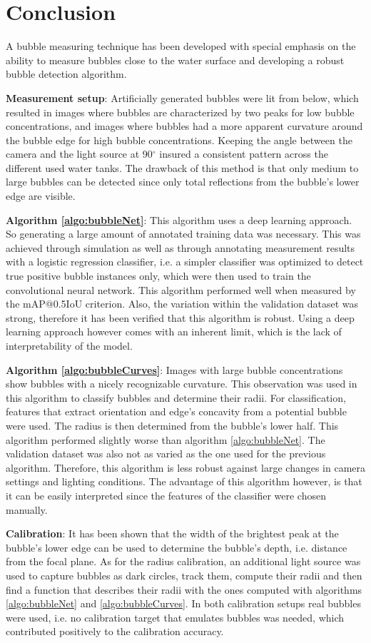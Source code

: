 \chapter{Conclusion}\label{discussion}
A bubble measuring technique has been developed with special emphasis on the ability to measure bubbles close to the water surface and developing a robust bubble detection algorithm. 

\textbf{Measurement setup}: Artificially generated bubbles were lit from below, which resulted in images where bubbles are characterized by two peaks for low bubble concentrations, and images where bubbles had a more apparent curvature around the bubble edge for high bubble concentrations. Keeping the angle between the camera and the light source at 90$^\circ$ insured a consistent pattern across the different used water tanks. The drawback of this method is that only medium to large bubbles can be detected since only total reflections from the bubble's lower edge are visible. 

\textbf{Algorithm \ref{algo:bubbleNet}}: This algorithm uses a deep learning approach. So generating a large amount of annotated training data was necessary. This was achieved through simulation as well as through annotating measurement results with a logistic regression classifier, i.e. a simpler classifier was optimized to detect true positive bubble instances only, which were then used to train the convolutional neural network. This algorithm performed well when measured by the mAP@0.5IoU criterion. Also, the variation within the validation dataset was strong, therefore it has been verified that this algorithm is robust. Using a deep learning approach however comes with an inherent limit, which is the lack of interpretability of the model. 

\textbf{Algorithm \ref{algo:bubbleCurves}}: Images with large bubble concentrations show bubbles with a nicely recognizable curvature. This observation was used in this algorithm to classify bubbles and determine their radii. For classification, features that extract orientation and edge's concavity from a potential bubble were used. The radius is then determined from the bubble's lower half. This algorithm performed slightly worse than algorithm \ref{algo:bubbleNet}. 
The validation dataset was also not as varied as the one used for the previous algorithm. Therefore, this algorithm is less robust against large changes in camera settings and lighting conditions. The advantage of this algorithm however, is that it can be easily interpreted since the features of the classifier were chosen manually. 

\textbf{Calibration}: It has been shown that the width of the brightest peak at the bubble's lower edge can be used to determine the bubble's depth, i.e. distance from the focal plane. As for the radius calibration, an additional light source was used to capture bubbles as dark circles, track them, compute their radii and then find a function that describes their radii with the ones computed with algorithms \ref{algo:bubbleNet} and \ref{algo:bubbleCurves}. In both calibration setups real bubbles were used, i.e. no calibration target that emulates bubbles was needed, which contributed positively to the calibration accuracy. 
